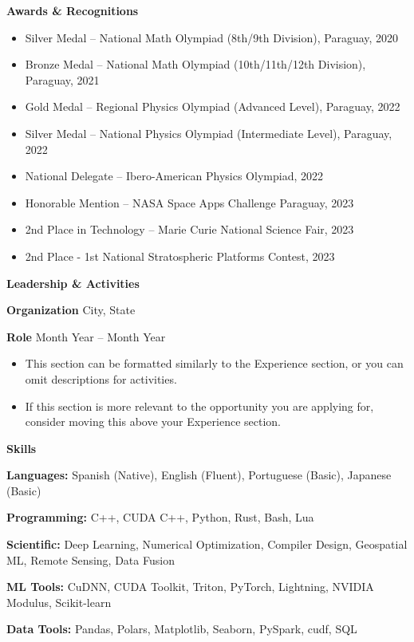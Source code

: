 \documentclass[11pt]{article}
\begin{document}
\begin{center}
    \textbf{Awards \& Recognitions}
\end{center}

\begin{itemize}[noitemsep]
    \item Silver Medal – National Math Olympiad (8th/9th Division), Paraguay, 2020
    \item Bronze Medal – National Math Olympiad (10th/11th/12th Division), Paraguay, 2021
    \item Gold Medal – Regional Physics Olympiad (Advanced Level), Paraguay, 2022
    \item Silver Medal – National Physics Olympiad (Intermediate Level), Paraguay, 2022
    \item National Delegate – Ibero-American Physics Olympiad, 2022
    \item Honorable Mention – NASA Space Apps Challenge Paraguay, 2023
    \item 2nd Place in Technology – Marie Curie National Science Fair, 2023
    \item 2nd Place - 1st National Stratospheric Platforms Contest, 2023
\end{itemize}


\begin{center}
    \textbf{Leadership \& Activities}
\end{center}

\textbf{Organization}	\hfill City, State

\textbf{Role} \hfill Month Year – Month Year
\begin{itemize}[noitemsep, topsep=0pt, partopsep=0pt, parsep=0pt]
    \item This section can be formatted similarly to the Experience section, or you can omit descriptions for activities.
    \item If this section is more relevant to the opportunity you are applying for, consider moving this above your Experience section.
\end{itemize}

\begin{center}
    \textbf{Skills}
\end{center}

\textbf{Languages:} Spanish (Native), English (Fluent), Portuguese (Basic), Japanese (Basic)

\textbf{Programming:} C++, CUDA C++, Python, Rust, Bash, Lua

\textbf{Scientific:} Deep Learning, Numerical Optimization, Compiler Design, Geospatial ML, Remote Sensing, Data Fusion

\textbf{ML Tools:} CuDNN, CUDA Toolkit, Triton, PyTorch, Lightning, NVIDIA Modulus, Scikit-learn

\textbf{Data Tools:} Pandas, Polars, Matplotlib, Seaborn, PySpark, cudf, SQL
\end{document}
